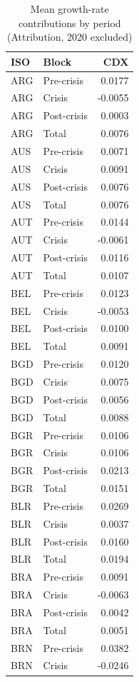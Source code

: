 
\begin{longtable}[t]{llr}
\caption{\label{tab:TAB-PERIOD-MEANS}Mean growth-rate contributions by period (Attribution, 2020 excluded)}\\
\toprule
ISO & Block & CDX\\
\midrule
ARG & Pre-crisis & 0.0177\\
ARG & Crisis & -0.0055\\
ARG & Post-crisis & 0.0003\\
ARG & Total & 0.0076\\
AUS & Pre-crisis & 0.0071\\
\addlinespace
AUS & Crisis & 0.0091\\
AUS & Post-crisis & 0.0076\\
AUS & Total & 0.0076\\
AUT & Pre-crisis & 0.0144\\
AUT & Crisis & -0.0061\\
\addlinespace
AUT & Post-crisis & 0.0116\\
AUT & Total & 0.0107\\
BEL & Pre-crisis & 0.0123\\
BEL & Crisis & -0.0053\\
BEL & Post-crisis & 0.0100\\
\addlinespace
BEL & Total & 0.0091\\
BGD & Pre-crisis & 0.0120\\
BGD & Crisis & 0.0075\\
BGD & Post-crisis & 0.0056\\
BGD & Total & 0.0088\\
\addlinespace
BGR & Pre-crisis & 0.0106\\
BGR & Crisis & 0.0106\\
BGR & Post-crisis & 0.0213\\
BGR & Total & 0.0151\\
BLR & Pre-crisis & 0.0269\\
\addlinespace
BLR & Crisis & 0.0037\\
BLR & Post-crisis & 0.0160\\
BLR & Total & 0.0194\\
BRA & Pre-crisis & 0.0091\\
BRA & Crisis & -0.0063\\
\addlinespace
BRA & Post-crisis & 0.0042\\
BRA & Total & 0.0051\\
BRN & Pre-crisis & 0.0382\\
BRN & Crisis & -0.0246\\

\end{longtable}
